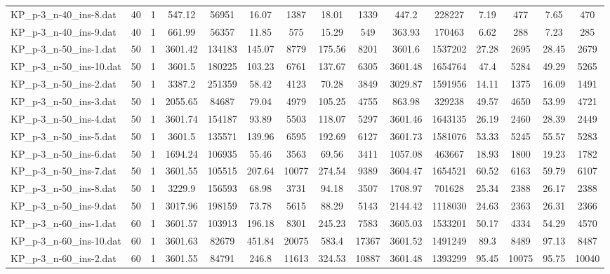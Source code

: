 \begin{table}[!ht]
{\begin{tabular}{lcccccccccccccc}
KP\_p-3\_n-40\_ins-8.dat & 40 & 1 & 547.12 & 56951 & 16.07 & 1387 & 18.01 & 1339 & 447.2 & 228227 & 7.19 & 477 & 7.65 & 470 \\
KP\_p-3\_n-40\_ins-9.dat & 40 & 1 & 661.99 & 56357 & 11.85 & 575 & 15.29 & 549 & 363.93 & 170463 & 6.62 & 288 & 7.23 & 285 \\
KP\_p-3\_n-50\_ins-1.dat & 50 & 1 & 3601.42 & 134183 & 145.07 & 8779 & 175.56 & 8201 & 3601.6 & 1537202 & 27.28 & 2695 & 28.45 & 2679 \\
KP\_p-3\_n-50\_ins-10.dat & 50 & 1 & 3601.5 & 180225 & 103.23 & 6761 & 137.67 & 6305 & 3601.48 & 1654764 & 47.4 & 5284 & 49.29 & 5265 \\
KP\_p-3\_n-50\_ins-2.dat & 50 & 1 & 3387.2 & 251359 & 58.42 & 4123 & 70.28 & 3849 & 3029.87 & 1591956 & 14.11 & 1375 & 16.09 & 1491 \\
KP\_p-3\_n-50\_ins-3.dat & 50 & 1 & 2055.65 & 84687 & 79.04 & 4979 & 105.25 & 4755 & 863.98 & 329238 & 49.57 & 4650 & 53.99 & 4721 \\
KP\_p-3\_n-50\_ins-4.dat & 50 & 1 & 3601.74 & 154187 & 93.89 & 5503 & 118.07 & 5297 & 3601.46 & 1643135 & 26.19 & 2460 & 28.39 & 2449 \\
KP\_p-3\_n-50\_ins-5.dat & 50 & 1 & 3601.5 & 135571 & 139.96 & 6595 & 192.69 & 6127 & 3601.73 & 1581076 & 53.33 & 5245 & 55.57 & 5283 \\
KP\_p-3\_n-50\_ins-6.dat & 50 & 1 & 1694.24 & 106935 & 55.46 & 3563 & 69.56 & 3411 & 1057.08 & 463667 & 18.93 & 1800 & 19.23 & 1782 \\
KP\_p-3\_n-50\_ins-7.dat & 50 & 1 & 3601.55 & 105515 & 207.64 & 10077 & 274.54 & 9389 & 3604.47 & 1654521 & 60.52 & 6163 & 59.79 & 6107 \\
KP\_p-3\_n-50\_ins-8.dat & 50 & 1 & 3229.9 & 156593 & 68.98 & 3731 & 94.18 & 3507 & 1708.97 & 701628 & 25.34 & 2388 & 26.17 & 2388 \\
KP\_p-3\_n-50\_ins-9.dat & 50 & 1 & 3017.96 & 198159 & 73.78 & 5615 & 88.29 & 5143 & 2144.42 & 1118030 & 24.63 & 2363 & 26.31 & 2366 \\
KP\_p-3\_n-60\_ins-1.dat & 60 & 1 & 3601.57 & 103913 & 196.18 & 8301 & 245.23 & 7583 & 3605.03 & 1533201 & 50.17 & 4334 & 54.29 & 4570 \\
KP\_p-3\_n-60\_ins-10.dat & 60 & 1 & 3601.63 & 82679 & 451.84 & 20075 & 583.4 & 17367 & 3601.52 & 1491249 & 89.3 & 8489 & 97.13 & 8487 \\
KP\_p-3\_n-60\_ins-2.dat & 60 & 1 & 3601.55 & 84791 & 246.8 & 11613 & 324.53 & 10887 & 3601.48 & 1393299 & 95.45 & 10075 & 95.75 & 10040 \\

\end{tabular}}
\end{table}
